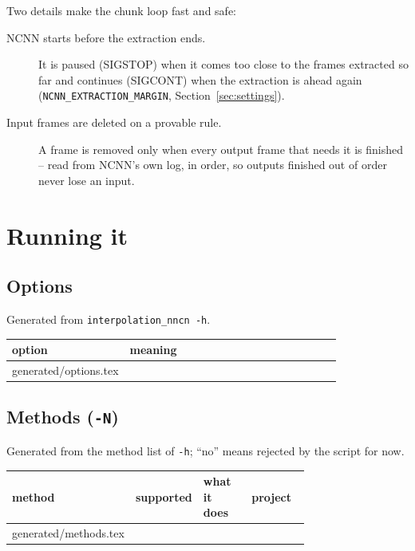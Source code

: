 \documentclass[11pt,a4paper]{article}
\makeatletter
\newcommand{\tablerows}[1]{\@@input #1 }
\makeatother
\begin{document}
Two details make the chunk loop fast and safe:
\begin{description}
  \item[NCNN starts before the extraction ends.] It is paused (SIGSTOP) when it comes too close to
    the frames extracted so far and continues (SIGCONT) when the extraction is ahead again
    (\texttt{NCNN\_EXTRACTION\_MARGIN}, Section~\ref{sec:settings}).
  \item[Input frames are deleted on a provable rule.] A frame is removed only when every output
    frame that needs it is finished -- read from NCNN's own log, in order, so outputs finished out
    of order never lose an input.
\end{description}

\section{Running it}\label{sec:running}

\subsection{Options}
Generated from \texttt{interpolation\_nncn -h}.

\begin{small}
\begin{longtable}{@{}l p{0.82\linewidth}@{}}
\toprule
\textbf{option} & \textbf{meaning} \\
\midrule
\endhead
\tablerows{generated/options.tex}
\bottomrule
\end{longtable}
\end{small}

\subsection{Methods (\texttt{-N})}
Generated from the method list of \texttt{-h}; ``no'' means rejected by the script for now.

\begin{small}
\begin{longtable}{@{}l l p{0.38\linewidth} p{0.36\linewidth}@{}}
\toprule
\textbf{method} & \textbf{supported} & \textbf{what it does} & \textbf{project} \\
\midrule
\endhead
\tablerows{generated/methods.tex}
\bottomrule
\end{longtable}
\end{small}
\end{document}
